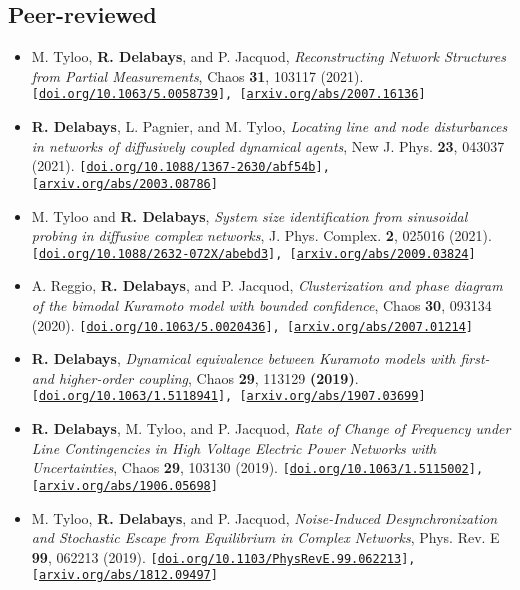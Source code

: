 \documentclass[10pt]{article}
\begin{document}
\subsection*{Peer-reviewed}
\begin{itemize} 
 \item M. Tyloo, \textcolor{hei}{\bf R. Delabays}, and P. Jacquod, 
 \textit{Reconstructing Network Structures from Partial Measurements}, 
 Chaos \textbf{31}, 103117 (2021).  
 {\footnotesize \tt [\url{doi.org/10.1063/5.0058739}], [\url{arxiv.org/abs/2007.16136}]}  

 \item \textcolor{hei}{\bf R. Delabays}, L. Pagnier, and M. Tyloo, 
 \textit{Locating line and node disturbances in networks of diffusively coupled dynamical agents}, 
 New J. Phys. \textbf{23}, 043037 (2021). 
 {\footnotesize \tt [\url{doi.org/10.1088/1367-2630/abf54b}], [\url{arxiv.org/abs/2003.08786}]}

 \item M. Tyloo and \textcolor{hei}{\bf R. Delabays}, 
 \textit{System size identification from sinusoidal probing in diffusive complex networks}, 
 J. Phys. Complex. \textbf{2}, 025016 (2021). 
 {\footnotesize \tt [\url{doi.org/10.1088/2632-072X/abebd3}], [\url{arxiv.org/abs/2009.03824}]}
 
 \item A. Reggio, \textcolor{hei}{\bf R. Delabays}, and P. Jacquod, 
 \textit{Clusterization and phase diagram of the bimodal Kuramoto model with bounded confidence}, 
 Chaos \textbf{30}, 093134 (2020). 
 {\footnotesize \tt [\url{doi.org/10.1063/5.0020436}], [\url{arxiv.org/abs/2007.01214}]}
 
 \item \textcolor{hei}{\bf R. Delabays}, 
 \textit{Dynamical equivalence between Kuramoto models with first- and higher-order coupling},
 Chaos \textbf{29}, 113129 {\bf (2019)}.
 {\footnotesize \tt [\url{doi.org/10.1063/1.5118941}], [\url{arxiv.org/abs/1907.03699}]}
 
 \item \textcolor{hei}{\bf R. Delabays}, M. Tyloo, and P. Jacquod,
 \textit{Rate of Change of Frequency under Line Contingencies in High Voltage Electric Power Networks with Uncertainties}, 
 Chaos \textbf{29}, 103130 (2019). 
 {\footnotesize \tt [\url{doi.org/10.1063/1.5115002}], [\url{arxiv.org/abs/1906.05698}]}
 
 \item M. Tyloo, \textcolor{hei}{\bf R. Delabays}, and P. Jacquod, 
 \textit{Noise-Induced Desynchronization and Stochastic Escape from Equilibrium in Complex Networks}, 
 Phys. Rev. E \textbf{99}, 062213 (2019).
 {\footnotesize \tt [\url{doi.org/10.1103/PhysRevE.99.062213}], [\url{arxiv.org/abs/1812.09497}]}
 

\end{itemize}
\end{document}
